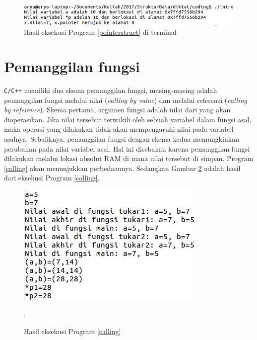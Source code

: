 \begin{figure}
\centering
\includegraphics[scale=.5]{pics/hasilintro.png}
\caption{Hasil eksekusi Program \ref{pointerstruct} di terminal}
\label{fig:hasilintro}
\end{figure}

\section{Pemanggilan fungsi}
\texttt{C/C++} memiliki dua skema pemanggilan fungsi, masing-masing adalah pemanggilan fungsi melalui nilai (\textit{calling by value}) dan melalui referensi (\textit{calling by reference}). Skema pertama, argumen fungsi adalah nilai dari yang akan dioperasikan. Jika nilai tersebut terwakili oleh sebuah variabel dalam fungsi asal, maka operasi yang dilakukan tidak akan mempengaruhi nilai pada variabel asalnya. Sebaliknya, pemanggilan fungsi dengan skema kedua memungkinkan perubahan pada nilai variabel asal. Hal ini disebakan karena pemanggilan fungsi dilakukan melalui lokasi absolut RAM di mana nilai tersebut di simpan. Program \ref{calling} akan menunjukkan perbedaannya. Sedangkan Gambar \ref{fig:function} adalah hasil dari eksekusi Program \ref{calling}.

\scriptsize

\normalsize

\begin{figure}[H]
\centering
\includegraphics[scale=.5]{pics/hasilfunction.png}
\caption{Hasil eksekusi Program \ref{calling}}
\label{fig:function}.
\end{figure}

